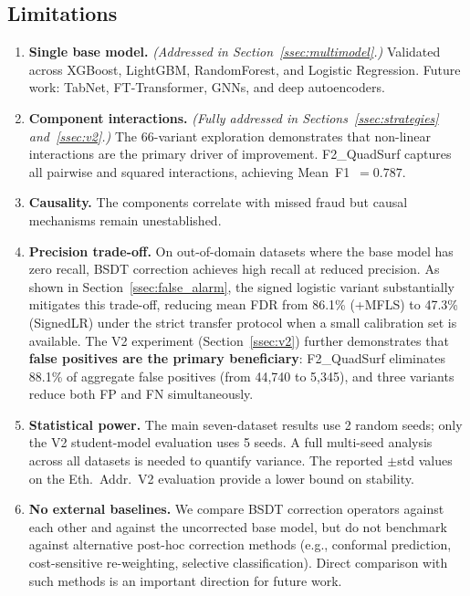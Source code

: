 \documentclass[journal]{IEEEtran}
\begin{document}
\subsection{Limitations}

\begin{enumerate}
  \item \textbf{Single base model.} \textit{(Addressed in Section~\ref{ssec:multimodel}.)} Validated across XGBoost, LightGBM, RandomForest, and Logistic Regression. Future work: TabNet, FT-Transformer, GNNs, and deep autoencoders.

  \item \textbf{Component interactions.} \textit{(Fully addressed in Sections~\ref{ssec:strategies} and~\ref{ssec:v2}.)} The 66-variant exploration demonstrates that non-linear interactions are the primary driver of improvement. F2\_QuadSurf captures all pairwise and squared interactions, achieving Mean~F1~$=0.787$.

  \item \textbf{Causality.} The components correlate with missed fraud but causal mechanisms remain unestablished.

  \item \textbf{Precision trade-off.} On out-of-domain datasets where the base model has zero recall, BSDT correction achieves high recall at reduced precision. As shown in Section~\ref{ssec:false_alarm}, the signed logistic variant substantially mitigates this trade-off, reducing mean FDR from 86.1\% (+MFLS) to 47.3\% (SignedLR) under the strict transfer protocol when a small calibration set is available. The V2 experiment (Section~\ref{ssec:v2}) further demonstrates that \textbf{false positives are the primary beneficiary}: F2\_QuadSurf eliminates 88.1\% of aggregate false positives (from 44{,}740 to 5{,}345), and three variants reduce both FP and FN simultaneously.

  \item \textbf{Statistical power.} The main seven-dataset results use 2 random seeds; only the V2 student-model evaluation uses 5 seeds. A full multi-seed analysis across all datasets is needed to quantify variance. The reported $\pm$std values on the Eth.\ Addr.\ V2 evaluation provide a lower bound on stability.

  \item \textbf{No external baselines.} We compare BSDT correction operators against each other and against the uncorrected base model, but do not benchmark against alternative post-hoc correction methods (e.g., conformal prediction, cost-sensitive re-weighting, selective classification). Direct comparison with such methods is an important direction for future work.


\end{enumerate}
\end{document}
